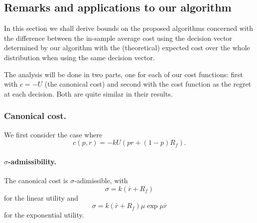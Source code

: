 \subsection{Remarks and applications to our algorithm}

In this section we shall derive bounds on the proposed algorithms concerned with the
difference between the in-sample average cost using the decision vector determined by our
algorithm with the (theoretical) expected cost over the whole distribution when using the
same decision vector. 

The analysis will be done in two parts, one for each of our cost functions: first with
$c=-U$ (the canonical cost) and second with the cost function as the regret at each
decision. Both are quite similar in their results. 

\subsubsection{Canonical cost.}
We first consider the case where 
\begin{equation*}
  c(p,r) = -k U(pr + (1-p)R_f).
\end{equation*}

\paragraph{$\sigma$-admissibility.}  The canonical cost is $\sigma$-adimissible, with 
\begin{equation}
  \label{linearSigmaAdmissibility}
  \sigma = k(\bar r+R_f)
\end{equation}
for the linear utility and 
\begin{equation}
  \label{expSigmaAdmissibility}
  \sigma = k (\bar r+ R_f) \mu\exp\mu\bar r
\end{equation}
for the exponential utility.

